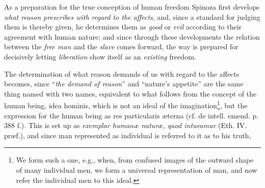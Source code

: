 \documentclass[12pt,a4paper,openany]{book}
\newcommand{\opage}[1]{\marginnote{\footnotesize\textit{[#1]}}}
\begin{document}
As a preparation for the true conception of human
freedom Spinoza first develops \emph{what reason
prescribes with regard to the affects}, and,
since a standard for judging them is thereby given,
he determines them as \emph{good} or \emph{evil} according to their
agreement with human nature; and since
through these developments the relation between
the \emph{free man} and the \emph{slave} comes forward, the way is prepared for decisively
letting \emph{liberation} show itself as an \emph{existing} freedom.

The determination of what reason demands of us with
regard to the affects becomes, since ``\emph{the demand of reason}''
and ``nature's appetite'' are the same thing named with two
names, equivalent to what follows from the concept of the human
being, idea hominis, which is not an ideal of the
imagination\footnote{We form such a one, e.g., when, from confused images of the
outward shape of many individual men, we form a universal representation
of man, and now refer the individual men to
this ideal.}, but the expression for the human being
\opage{123}\setcounter{footnote}{0}as res particularis æterna (cf. de intell. emend. p. 388 f.).
This is set up as \emph{exemplar humanæ naturæ, quod
intueamur} (Eth. IV. præf.), and since man represented as
individual is referred to it as to his truth,
\end{document}
